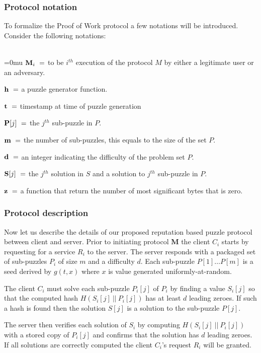 \subsubsection{Protocol notation}\label{text:protonot}
To formalize the Proof of Work protocol a few notations will be introduced. Consider the following notations:
\\
\\
\indent \begin{minipage}{0.9\linewidth}
\thickmuskip=0mu
${\textbf M_i} \ = $ to be $i^{th}$ execution of the protocol $M$ by either a legitimate user or an adversary. 

${\textbf h} \ = $ a puzzle generator function.

${\textbf t} \ = $ timestamp at time of puzzle generation

${\textbf P[j]} \ = $ the $j^{th}$ sub-puzzle in $P$.

${\textbf m} \ = $ the number of sub-puzzles, this equals to the size of the set $P$. 

${\textbf d} \ = $ an integer indicating the difficulty of the problem set $P$. 

${\textbf S[j]} \ = $ the $j^{th}$ solution in $S$ and a solution to $j^{th}$ sub-puzzle in $P$. 

${\textbf z} \ = $ a function that return the number of most significant bytes that is zero. 
\end{minipage}

\subsubsection{Protocol description}\label{text:protodesc}
Now let us describe the details of our proposed reputation based puzzle protocol between client and server. Prior to initiating protocol \textbf{M} the client $C_i$ starts by requesting for a service $R_i$ to the server. The server responds with a packaged set of sub-puzzles $P_i$ of size $m$ and a difficulty $d$. Each sub-puzzle $P[1] \dots P[m]$ is a seed derived by $g(t,x)$ where $x$ is value generated uniformly-at-random.

The client $C_i$ must solve each sub-puzzle $P_i[j]$ of $P_i$ by finding a value $S_i[j]$ so that the computed hash $H(S_i[j] \ || \ P_i[j] )$ has at least $d$ leading zeroes. If such a hash is found then the solution $S[j]$ is a solution to the sub-puzzle $P[j]$.

The server then verifies each solution of $S_i$ by computing $H(S_i[j] \ || \ P_i[j])$ with a stored copy of $P_i[j]$ and confirms that the solution has $d$ leading zeroes. If all solutions are correctly computed the client $C_i$'s request $R_i$ will be granted. 


